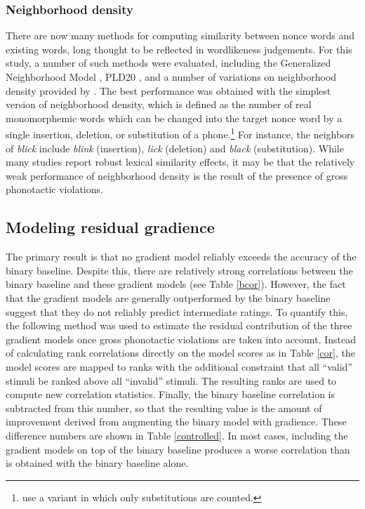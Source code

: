 \subsubsection{Neighborhood density} 
\label{density}

There are now many methods for computing similarity between nonce words and existing words, long thought to be reflected in wordlikeness judgements. 
For this study, a number of such methods were evaluated, including the Generalized Neighborhood Model \citep{Bailey2001}, PLD20 \citep{Suarez2011}, and a number of variations on neighborhood density \citep{Coltheart1977} provided by \citet{Vaden2009}. The best performance was obtained with the simplest version of neighborhood density, which is defined as the number of real monomorphemic words which can be changed into the target nonce word by a single insertion, deletion, or substitution of a phone.\footnote{\citet{Greenberg1964} use a variant in which only substitutions are counted.} For instance, the neighbors of \emph{blick} include \emph{blink} (insertion), \emph{lick} (deletion) and \emph{black} (substitution). While many studies \citep[e.g.,][]{Bailey2001} report robust lexical similarity effects, it may be that the relatively weak performance of neighborhood density is the result of the presence of gross phonotactic violations.

\subsection{Modeling residual gradience}

The primary result is that no gradient model reliably exceeds the accuracy of the binary baseline. Despite this, there are relatively strong correlations between the binary baseline and these gradient models (see Table \ref{bcor}). However, the fact that the gradient models are generally outperformed by the binary baseline suggest that they do not reliably predict intermediate ratings. To quantify this, the following method was used to estimate the residual contribution of the three gradient models once gross phonotactic violations are taken into account. Instead of calculating rank correlations directly on the model scores as in Table \ref{cor}, the model scores are mapped to ranks with the additional constraint that all ``valid'' stimuli be ranked above all ``invalid'' stimuli. The resulting ranks are used to compute new correlation statistics. Finally, the binary baseline correlation is subtracted from this number, so that the resulting value is the amount of improvement derived from augmenting the binary model with gradience. These difference numbers are shown in Table \ref{controlled}. In most cases, including the gradient models on top of the binary baseline produces a worse correlation than is obtained with the binary baseline alone.

